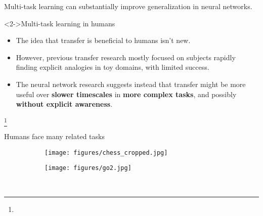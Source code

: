 \documentclass{beamer}
\newcommand\blfootnote[1]{%
  \begingroup
  \renewcommand\thefootnote{}\footnote{#1}%
  \addtocounter{footnote}{-1}%
  \endgroup
}
\begin{document}
\begin{frame}[standout]
Multi-task learning can substantially improve generalization in neural networks.\par
\end{frame}


\begin{frame}<2->{Multi-task learning in humans}
\begin{itemize}
\item The idea that transfer is beneficial to humans isn't new.
\item<3-> However, previous transfer research mostly focused on subjects rapidly finding explicit analogies in toy domains, with limited success.
\item<4-> The neural network research suggests instead that transfer might be more useful over \textbf{slower timescales} in \textbf{more complex tasks}, and possibly \textbf{without explicit awareness}.
\end{itemize}
\vspace{2em}
\blfootnote{
    \only<1,4->{\citep{Lampinen2017a, Bransford1999}}
}

\end{frame}

\begin{frame}{Humans face many related tasks}
\begin{figure}
\centering
\begin{subfigure}{0.4\textwidth}
\texttt{[image: figures/chess\_cropped.jpg]}
\end{subfigure}%
\begin{subfigure}{0.4\textwidth}
\texttt{[image: figures/go2.jpg]}
\end{subfigure}\\
\end{figure}
\end{frame}
\end{document}
